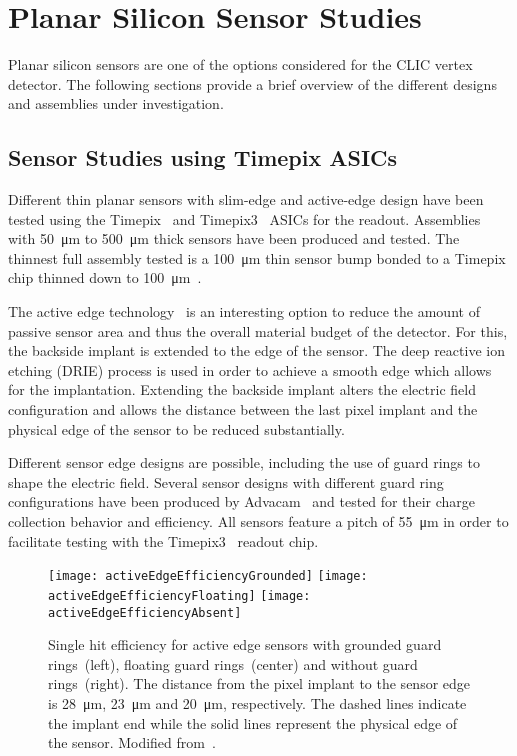 \documentclass[a4paper,11pt]{article}
\begin{document}
\section{Planar Silicon Sensor Studies}
\label{sec:planar}

Planar silicon sensors are one of the options considered for the CLIC vertex detector.
The following sections provide a brief overview of the different designs and assemblies under investigation.

\subsection{Sensor Studies using Timepix ASICs}

Different thin planar sensors with slim-edge and active-edge design have been tested using the Timepix~\cite{timepix} and Timepix3~\cite{timepix3} ASICs for the readout.
Assemblies with \SI{50}{\um} to \SI{500}{\um} thick sensors have been produced and tested.
The thinnest full assembly tested is a \SI{100}{\um} thin sensor bump bonded to a Timepix chip thinned down to \SI{100}{\um}~\cite{thin-timepix}.

The active edge technology~\cite{edgeless} is an interesting option to reduce the amount of passive sensor area and thus the overall material budget  of the detector.
For this, the backside implant is extended to the edge of the sensor.
The deep reactive ion etching (DRIE) process is used in order to achieve a smooth edge which allows for the implantation.
Extending the backside implant alters the electric field configuration and allows the distance between the last pixel implant and the physical edge of the sensor to be reduced substantially.

Different sensor edge designs are possible, including the use of guard rings to shape the electric field.
Several sensor designs with different guard ring configurations have been produced by Advacam~\cite{advacam} and tested for their charge collection behavior and efficiency.
All sensors feature a pitch of \SI{55}{\um} in order to facilitate testing with the Timepix3~\cite{timepix3} readout chip.

\begin{figure}[tbp]
  \center
  \texttt{[image: activeEdgeEfficiencyGrounded]}%
  \texttt{[image: activeEdgeEfficiencyFloating]}%
  \texttt{[image: activeEdgeEfficiencyAbsent]}
  \caption[Single hit efficiency of active edge sensors]{Single hit efficiency for active edge sensors with grounded guard rings~(left), floating guard rings~(center) and without guard rings~(right). The distance from the pixel implant to the sensor edge is \SI{28}{\um}, \SI{23}{\um} and \SI{20}{\um}, respectively. The dashed lines indicate the implant end while the solid lines represent the physical edge of the sensor. Modified from~\cite{nilou-proc}.}
  \label{fig:active}
\end{figure}
\end{document}

